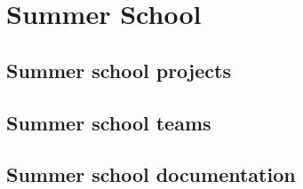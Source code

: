 \chapter{Summer School}

\section{Summer school projects}
\label{sec:scprojects}


\section{Summer school teams}
\label{sec:scteams}


\section{Summer school documentation}
\label{sec:scdocumentation}